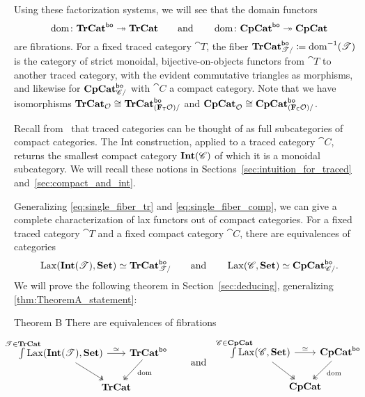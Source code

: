 \documentclass[11pt,oneside,article]{memoir}
\begin{document}
Using these factorization systems, we will see that the domain functors
\[
   \operatorname{dom}\colon\mathbf{TrCat}^{\mathsf{bo}}\twoheadrightarrow\mathbf{TrCat}
   \qquad\text{and}\qquad
   \operatorname{dom}\colon\mathbf{CpCat}^{\mathsf{bo}}\twoheadrightarrow\mathbf{CpCat}
\]
are fibrations. For a fixed traced category $\cat{T}$, the fiber
$\mathbf{TrCat}^{\mathsf{bo}}_{\mathscr{T}/}\coloneqq\operatorname{dom}^{-1}(\mathscr{T})$ is the category of strict monoidal,
bijective-on-objects functors from $\cat{T}$ to another traced category, with the evident
commutative triangles as morphisms, and likewise for $\mathbf{CpCat}^{\mathsf{bo}}_{\mathscr{C}/}$ with $\cat{C}$ a
compact category. Note that we have isomorphisms $\mathbf{TrCat}_{\mathcal{O}}\cong\mathbf{TrCat}^{\mathsf{bo}}_{(\mathbf{F}_{\mathsf{T}}\mathcal{O})/}$
and $\mathbf{CpCat}_{\mathcal{O}}\cong\mathbf{CpCat}^{\mathsf{bo}}_{(\mathbf{F}_{\mathsf{C}}\mathcal{O})/}$.

Recall from~\cite{JoyalStreetVerity} that traced categories can be thought of as full subcategories
of compact categories.  The Int construction, applied to a traced category $\cat{C}$, returns the
smallest compact category $\mathbf{Int}(\mathscr{C})$ of which it is a monoidal subcategory. We will recall these
notions in Sections~\ref{sec:intuition_for_traced} and~\ref{sec:compact_and_int}.

Generalizing \eqref{eq:single_fiber_tr} and \eqref{eq:single_fiber_comp}, we can give a complete
characterization of lax functors out of compact categories. For a fixed traced category $\cat{T}$
and a fixed compact category $\cat{C}$, there are equivalences of categories
\begin{equation}
      \label{eqn:lax_compcat_bo}
   \operatorname{Lax}(\mathbf{Int}(\mathscr{T}),\mathbf{Set})\simeq\mathbf{TrCat}^{\mathsf{bo}}_{\mathscr{T}/}
   \qquad\text{and}\qquad
   \operatorname{Lax}(\mathscr{C},\mathbf{Set})\simeq\mathbf{CpCat}^{\mathsf{bo}}_{\mathscr{C}/}.
\end{equation}
We will prove the following theorem in Section~\ref{sec:deducing}, generalizing
\ref{thm:TheoremA_statement}:

\begin{named}{Theorem B}
      \label{thm:TheoremB_statement}
   There are equivalences of fibrations
   \begin{equation*}
      \begin{tikzcd}[column sep=-1em]
         \int\limits^{\mathclap{\cat{T}\in\TrCat}} \Lax(\Int(\cat{T}),\Set)
               \ar[rr,"\equiv"] \ar[dr,two heads]
            && \TrCat^{\bo} \ar[dl,two heads,"\dom" pos=.4] \\
         & \TrCat &
      \end{tikzcd}
      \qquad\text{and}\qquad
      \begin{tikzcd}[column sep=-1em]
         \int\limits^{\mathclap{\cat{C}\in\CompCat}} \Lax(\cat{C},\Set)
               \ar[rr,"\equiv"] \ar[dr,two heads]
            && \CompCat^{\bo} \ar[dl,two heads,"\dom" pos=.4] \\
         & \CompCat &
      \end{tikzcd}
   \end{equation*}
\end{named}
\end{document}
